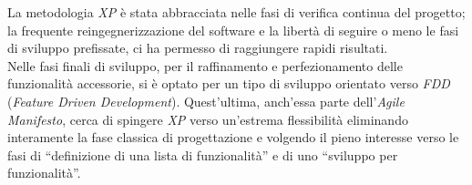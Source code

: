 La metodologia \textit{XP} è stata abbracciata nelle fasi di verifica continua del progetto; la frequente reingegnerizzazione del software e la libertà di seguire o meno le fasi di sviluppo prefissate, ci ha permesso di raggiungere rapidi risultati.\\
Nelle fasi finali di sviluppo, per il raffinamento e perfezionamento delle funzionalità accessorie, si è optato per un tipo di sviluppo orientato verso \textit{FDD} (\textit{Feature Driven Development}).
Quest'ultima, anch'essa parte dell'\textit{Agile Manifesto}, cerca di spingere \textit{XP} verso un'estrema flessibilità eliminando interamente la fase classica di progettazione e volgendo il pieno interesse verso le fasi di ``definizione di una lista di funzionalità'' e di uno ``sviluppo per funzionalità''.
